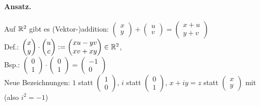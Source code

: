 \documentclass[12pt]{scrreprt}
\begin{document}
\paragraph{Ansatz.} Auf $\mathbb{R}^2$ gibt es (Vektor-)addition: $\begin{pmatrix} x\\y \end{pmatrix} + \begin{pmatrix} u\\v \end{pmatrix} =
\begin{pmatrix} x+u \\ y+v \end{pmatrix}$\\
Def.: $\begin{pmatrix} x\\ y \end{pmatrix} \cdot \begin{pmatrix} u \\ c \end{pmatrix} := \begin{pmatrix} xu-yv \\ xv+xy \end{pmatrix} \in \mathbb{R}^2$,\\
Bsp.: $\begin{pmatrix} 0 \\ 1 \end{pmatrix}\cdot\begin{pmatrix} 0 \\ 1 \end{pmatrix}=\begin{pmatrix} -1 \\ 0 \end{pmatrix}$\\
Neue Bezeichnungen: $1$ statt $\begin{pmatrix} 1 \\ 0 \end{pmatrix}$, $i$ statt $\begin{pmatrix} 0 \\ 1 \end{pmatrix}$, 
$x+iy = z$ statt $ \begin{pmatrix} x \\ y \end{pmatrix}$ mit  (also $i^2=-1$) \\

\end{document}
